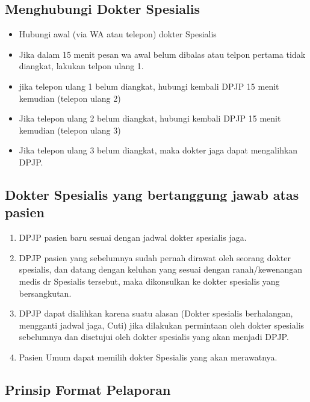 \documentclass[
]{book}
\providecommand{\tightlist}{%
  \setlength{\itemsep}{0pt}\setlength{\parskip}{0pt}}
\begin{document}
\hypertarget{menghubungi-dokter-spesialis}{%
\subsection{Menghubungi Dokter Spesialis}\label{menghubungi-dokter-spesialis}}

\begin{itemize}
\tightlist
\item
  Hubungi awal (via WA atau telepon) dokter Spesialis
\item
  Jika dalam 15 menit pesan wa awal belum dibalas atau telpon pertama tidak diangkat, lakukan telpon ulang 1.
\item
  jika telepon ulang 1 belum diangkat, hubungi kembali DPJP 15 menit kemudian (telepon ulang 2)
\item
  Jika telepon ulang 2 belum diangkat, hubungi kembali DPJP 15 menit kemudian (telepon ulang 3)
\item
  Jika telepon ulang 3 belum diangkat, maka dokter jaga dapat mengalihkan DPJP.
\end{itemize}

\hypertarget{dokter-spesialis-yang-bertanggung-jawab-atas-pasien}{%
\subsection{Dokter Spesialis yang bertanggung jawab atas pasien}\label{dokter-spesialis-yang-bertanggung-jawab-atas-pasien}}

\begin{enumerate}
\def\labelenumi{\arabic{enumi}.}
\tightlist
\item
  DPJP pasien baru sesuai dengan jadwal dokter spesialis jaga.
\item
  DPJP pasien yang sebelumnya sudah pernah dirawat oleh seorang dokter spesialis, dan datang dengan keluhan yang sesuai dengan ranah/kewenangan medis dr Spesialis tersebut, maka dikonsulkan ke dokter spesialis yang bersangkutan.
\item
  DPJP dapat dialihkan karena suatu alasan (Dokter spesialis berhalangan, mengganti jadwal jaga, Cuti) jika dilakukan permintaan oleh dokter spesialis sebelumnya dan disetujui oleh dokter spesialis yang akan menjadi DPJP.
\item
  Pasien Umum dapat memilih dokter Spesialis yang akan merawatnya.
\end{enumerate}

\hypertarget{prinsip-format-pelaporan}{%
\subsection{Prinsip Format Pelaporan}\label{prinsip-format-pelaporan}}
\end{document}
